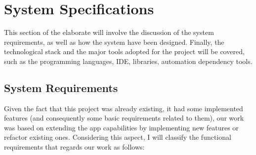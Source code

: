 \newpage
\section{System Specifications}
This section of the elaborate will involve the discussion of the system requirements, as well as how the system have been designed. Finally, the technological stack and the major tools adopted for the project will be covered, such as the programming languages, IDE, libraries, automation dependency tools.
\subsection{System Requirements}
Given the fact that this project was already existing, it had some implemented features (and consequently some basic requirements related to them), our work was based on extending the app capabilities by implementing new features or refactor existing ones. \newline Considering this aspect, I will classify the functional requirements that regards our work as follows:
% 
%     
